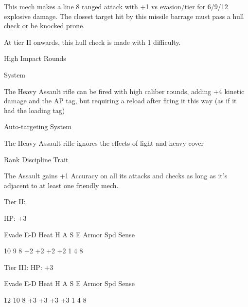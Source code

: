 This mech makes a line 8 ranged attack with +1 vs evasion/tier for 6/9/12 explosive damage. The
closest target hit by this missile barrage must pass a hull check or be knocked prone.

At tier II onwards, this hull check is made with 1 difficulty.


High Impact Rounds

System

The Heavy Assault rifle can be fired with high caliber rounds, adding +4 kinetic damage and the
AP tag, but requiring a reload after firing it this way (as if it had the loading tag)


Auto-targeting
System

The Heavy Assault rifle ignores the effects of light and heavy cover


Rank Discipline
Trait

The Assault gains +1 Accuracy on all its attacks and checks as long as it’s adjacent to at least
one friendly mech.


Tier II:

HP: +3


          Evade    E-D    Heat     H    A     S     E       Armor        Spd      Sense

          10       9      8        +2   +2    +2    +2      1            4        8

Tier III:
HP: +3


          Evade    E-D    Heat     H    A     S     E       Armor        Spd      Sense

          12        10    8        +3   +3    +3    +3      1            4        8

